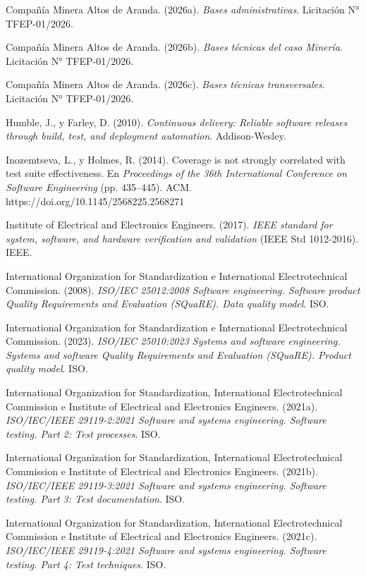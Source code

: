 \documentclass[subdoc]{../../comun/overfore}
\begin{document}
\begin{referencias}
\item Compañía Minera Altos de Aranda. (2026a). \emph{Bases administrativas}. Licitación N° TFEP-01/2026.
\item Compañía Minera Altos de Aranda. (2026b). \emph{Bases técnicas del caso Minería}. Licitación N° TFEP-01/2026.
\item Compañía Minera Altos de Aranda. (2026c). \emph{Bases técnicas transversales}. Licitación N° TFEP-01/2026.
\item Humble, J., y Farley, D. (2010). \emph{Continuous delivery: Reliable software releases through build, test, and deployment automation}. Addison-Wesley.
\item Inozemtseva, L., y Holmes, R. (2014). Coverage is not strongly correlated with test suite effectiveness. En \emph{Proceedings of the 36th International Conference on Software Engineering} (pp. 435–445). ACM. https://doi.org/10.1145/2568225.2568271
\item Institute of Electrical and Electronics Engineers. (2017). \emph{IEEE standard for system, software, and hardware verification and validation} (IEEE Std 1012-2016). IEEE.
\item International Organization for Standardization e International Electrotechnical Commission. (2008). \emph{ISO/IEC 25012:2008 Software engineering. Software product Quality Requirements and Evaluation (SQuaRE). Data quality model}. ISO.
\item International Organization for Standardization e International Electrotechnical Commission. (2023). \emph{ISO/IEC 25010:2023 Systems and software engineering. Systems and software Quality Requirements and Evaluation (SQuaRE). Product quality model}. ISO.
\item International Organization for Standardization, International Electrotechnical Commission e Institute of Electrical and Electronics Engineers. (2021a). \emph{ISO/IEC/IEEE 29119-2:2021 Software and systems engineering. Software testing. Part 2: Test processes}. ISO.
\item International Organization for Standardization, International Electrotechnical Commission e Institute of Electrical and Electronics Engineers. (2021b). \emph{ISO/IEC/IEEE 29119-3:2021 Software and systems engineering. Software testing. Part 3: Test documentation}. ISO.
\item International Organization for Standardization, International Electrotechnical Commission e Institute of Electrical and Electronics Engineers. (2021c). \emph{ISO/IEC/IEEE 29119-4:2021 Software and systems engineering. Software testing. Part 4: Test techniques}. ISO.

\end{referencias}
\end{document}
